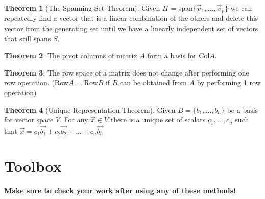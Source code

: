 \documentclass[a4paper,12pt]{article}
\theoremstyle{definition}
\newtheorem{theorem}{Theorem}
\theoremstyle{definition}
\newcommand{\finitevecs}[2]{#1_1,\ldots,#1_#2}
\newcommand{\finitevecsset}[2]{\{\finitevecs{#1}{#2}\}}
\newcommand{\finiteadd}[3]{#1 + #2 + \ldots + #3}
\begin{document}
	\begin{theorem}[The Spanning Set Theorem]
		\label{thm:spanning-set-thm}
		Given $H$ = span$\finitevecsset{\vec{v}}{p}$ we can repeatedly find a vector that is a linear combination of the others and delete this vector from the generating set until we have a linearly independent set of vectors that still spans $S$.
	\end{theorem}
	
	\begin{theorem}
		\label{thm:basis-col-space-thm}
		The pivot columns of matrix $A$ form a basis for Col$A$.
	\end{theorem}
	
	\begin{theorem}
		\label{thm:row-space-equiv-thm}
		The row space of a matrix does not change after performing one row operation. (Row$A$ = Row$B$ if $B$ can be obtained from $A$ by performing 1 row operation)
	\end{theorem}
	
	\begin{theorem}[Unique Representation Theorem]
		\label{thm:uniq-rep-thm}
		Given $B = \finitevecsset{b}{n}$ be a basis for vector space $V$. For any $\vec{x} \in V$ there is a unique set of scalars $\finitevecs{c}{n}$ such that $\vec{x} = \finiteadd{c_1\vec{b_1}}{c_2\vec{b_2}}{c_n\vec{b_n}}$
	\end{theorem}
	\newpage
	
	\section{Toolbox}
	\textbf{Make sure to check your work after using any of these methods!}
	
\end{document}
